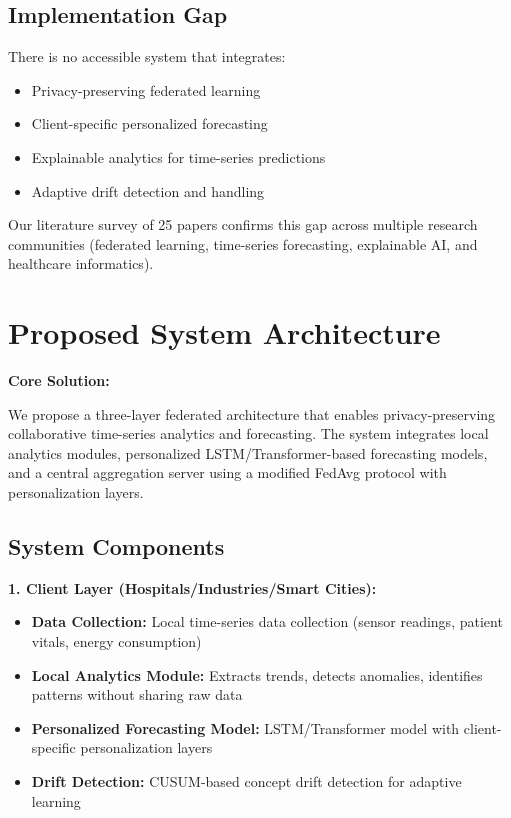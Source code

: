 \documentclass[11pt, a4paper]{article}
\begin{document}
\subsection{Implementation Gap}

There is no accessible system that integrates:
\begin{itemize}[noitemsep, topsep=0pt]
    \item Privacy-preserving federated learning
    \item Client-specific personalized forecasting
    \item Explainable analytics for time-series predictions
    \item Adaptive drift detection and handling
\end{itemize}

Our literature survey of 25 papers confirms this gap across multiple research communities (federated learning, time-series forecasting, explainable AI, and healthcare informatics).

\section{Proposed System Architecture}

\textbf{Core Solution:} 

We propose a three-layer federated architecture that enables privacy-preserving collaborative time-series analytics and forecasting. The system integrates local analytics modules, personalized LSTM/Transformer-based forecasting models, and a central aggregation server using a modified FedAvg protocol with personalization layers.

\subsection{System Components}

\textbf{1. Client Layer (Hospitals/Industries/Smart Cities):}
\begin{itemize}[noitemsep, topsep=0pt]
    \item \textbf{Data Collection:} Local time-series data collection (sensor readings, patient vitals, energy consumption)
    \item \textbf{Local Analytics Module:} Extracts trends, detects anomalies, identifies patterns without sharing raw data
    \item \textbf{Personalized Forecasting Model:} LSTM/Transformer model with client-specific personalization layers
    \item \textbf{Drift Detection:} CUSUM-based concept drift detection for adaptive learning
\end{itemize}
\end{document}
